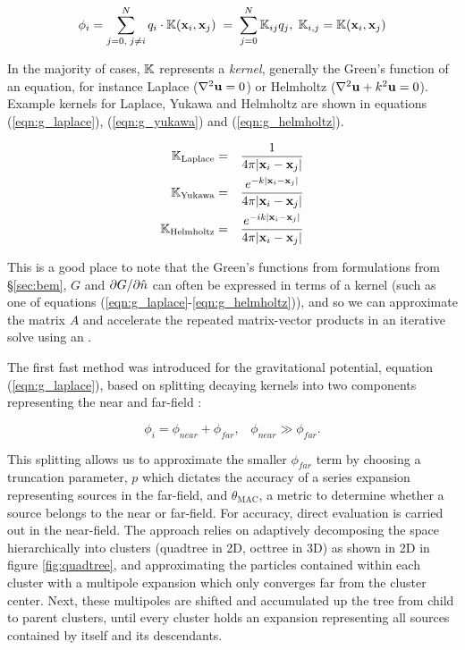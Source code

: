 \begin{equation}\label{eqn:nbody}
	\phi_{i} = \sum_{j=0,\; j\ne i}^{N} q_{i}\cdot\K(\vect{x}_{i},\vect{x}_{j}) \; = \; \sum_{j=0}^{N}\K_{ij}q_{j}, \; \K_{i,j} = \K(\vect{x}_{i},\vect{x}_{j})
\end{equation}

In the majority of cases, $\mathbb{K}$ represents a \emph{kernel}, generally the Green's function of an equation, for instance Laplace ($\nabla^{2}\mathbf{u} = 0$) or Helmholtz ($\nabla^{2}\mathbf{u}+k^{2}\mathbf{u}=0$). Example kernels for Laplace, Yukawa and Helmholtz are shown in equations (\ref{eqn:g_laplace}), (\ref{eqn:g_yukawa}) and (\ref{eqn:g_helmholtz}).

\begin{eqnarray}
	\K_{\text{Laplace}} & = & \frac{1}{4\pi |\vect{x}_i-\vect{x}_j|}\label{eqn:g_laplace} \\
	\K_{\text{Yukawa}} & = & \frac{e^{-k|\vect{x}_i-\vect{x}_j|}}{4\pi |\vect{x}_i-\vect{x}_j|}\label{eqn:g_yukawa} \\
	\K_{\text{Helmholtz}} & = & \frac{e^{-ik|\vect{x}_i-\vect{x}_j|}}{4\pi |\vect{x}_i-\vect{x}_j|}\label{eqn:g_helmholtz}
\end{eqnarray}

This is a good place to note that the Green's functions from {\bem} formulations from \S\ref{sec:bem}, $G$ and $\partial G / \partial \hat{n}$ can often be expressed in terms of a kernel (such as one of equations (\ref{eqn:g_laplace}-\ref{eqn:g_helmholtz})), and so we can approximate the {\bem} matrix $A$ and accelerate the repeated matrix-vector products in an iterative solve using an {\fmm}.

The first fast method was introduced for the gravitational potential, equation (\ref{eqn:g_laplace}), based on splitting decaying kernels into two components representing the near and far-field \cite{BarnesHut1986}:

\begin{equation}
	\phi_{i} = \phi_{near} + \phi_{far}, \;\;\; \phi_{near} \gg \phi_{far}.
\end{equation}

This splitting allows us to approximate the smaller $\phi_{far}$ term by choosing a truncation parameter, $p$ which dictates the accuracy of a series expansion representing sources in the far-field, and $\theta_{\text{MAC}}$, a metric to determine whether a source belongs to the near or far-field. For accuracy, direct evaluation is carried out in the near-field. The approach relies on adaptively decomposing the space hierarchically into clusters (quadtree in 2D, octtree in 3D) as shown in 2D in figure \ref{fig:quadtree}, and approximating the particles contained within each cluster with a multipole expansion which only converges far from the cluster center. Next, these multipoles are shifted and accumulated up the tree from child to parent clusters, until every cluster holds an expansion representing all sources contained by itself and its descendants. 

